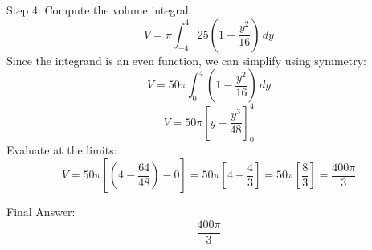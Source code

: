 \documentclass[11pt, a4paper]{article}
\begin{document}
Step 4: Compute the volume integral.
\[
V = \pi \int_{-4}^{4} 25 \left( 1 - \frac{y^2}{16} \right) \, dy
\]
Since the integrand is an even function, we can simplify using symmetry:
\[
V = 50\pi \int_{0}^{4} \left( 1 - \frac{y^2}{16} \right) \, dy
\]
\[
V = 50\pi \left[ y - \frac{y^3}{48} \right]_{0}^{4}
\]
Evaluate at the limits:
\[
V = 50\pi \left[ \left(4 - \frac{64}{48}\right) - 0 \right] = 50\pi \left[ 4 - \frac{4}{3} \right] = 50\pi \left[ \frac{8}{3} \right] = \frac{400\pi}{3}
\]

Final Answer:
\[
\boxed{\frac{400\pi}{3}}
\]

\end{document}
